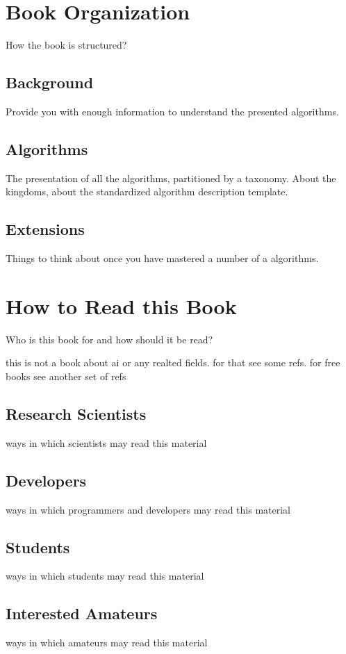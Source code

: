 % 
% 
\section{Book Organization}
\label{intro:sec:organization}
How the book is structured?

\subsection{Background}
Provide you with enough information to understand the presented algorithms.

\subsection{Algorithms}
The presentation of all the algorithms, partitioned by a taxonomy. 
About the kingdoms, about the standardized algorithm description template.

\subsection{Extensions}
Things to think about once you have mastered a number of a algorithms.


% 
% 
\section{How to Read this Book}
\label{intro:sec:how_to_read}
Who is this book for and how should it be read?

this is not a book about ai or any realted fields. for that see some refs. 
for free books see another set of refs

\subsection{Research Scientists}
ways in which scientists may read this material

\subsection{Developers}
ways in which programmers and developers may read this material

\subsection{Students}
ways in which students may read this material

\subsection{Interested Amateurs}
ways in which amateurs may read this material

